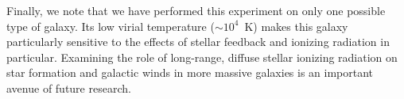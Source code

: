 \documentclass[twocolumn]{aastex62}
\begin{document}
Finally, we note that we have performed this experiment on only one possible type of galaxy. Its low virial temperature ($\sim10^{4}$~K) makes this galaxy particularly sensitive to the effects of stellar feedback and ionizing radiation in particular. Examining the role of long-range, diffuse stellar ionizing radiation on star formation and galactic winds in more massive galaxies is an important avenue of future research. 



\end{document}
